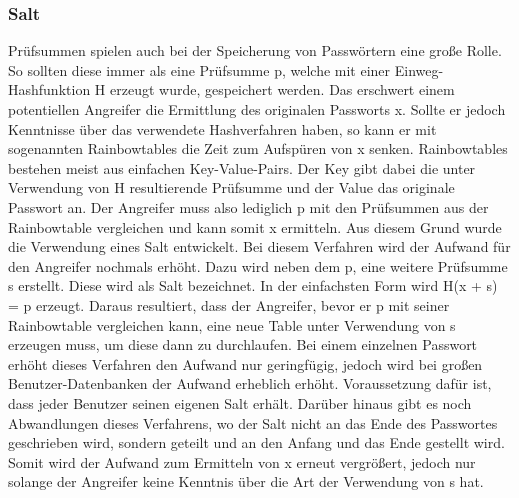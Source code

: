 \subsubsection{Salt}
\label{salt}
Prüfsummen spielen auch bei der Speicherung von Passwörtern eine große Rolle.
So sollten diese immer als eine Prüfsumme p, welche mit einer Einweg-Hashfunktion H erzeugt wurde, gespeichert werden.
Das erschwert einem potentiellen Angreifer die Ermittlung des originalen Passworts x.
Sollte er jedoch Kenntnisse über das verwendete Hashverfahren haben, so kann er mit sogenannten Rainbowtables die Zeit zum Aufspüren von x senken.
Rainbowtables bestehen meist aus einfachen Key-Value-Pairs.
Der Key gibt dabei die unter Verwendung von H resultierende Prüfsumme und der Value das originale Passwort an.
Der Angreifer muss also lediglich p mit den Prüfsummen aus der Rainbowtable vergleichen und kann somit x ermitteln.
Aus diesem Grund wurde die Verwendung eines Salt entwickelt.
Bei diesem Verfahren wird der Aufwand für den Angreifer nochmals erhöht.
Dazu wird neben dem p, eine weitere Prüfsumme s erstellt.
Diese wird als Salt bezeichnet.
In der einfachsten Form wird H(x + s) = p erzeugt.
Daraus resultiert, dass der Angreifer, bevor er p mit seiner Rainbowtable vergleichen kann, eine neue Table unter Verwendung von s erzeugen muss, um diese dann zu durchlaufen.
Bei einem einzelnen Passwort erhöht dieses Verfahren den Aufwand nur geringfügig, jedoch wird bei großen Benutzer-Datenbanken der Aufwand erheblich erhöht.
Voraussetzung dafür ist, dass jeder Benutzer seinen eigenen Salt erhält.
Darüber hinaus gibt es noch Abwandlungen dieses Verfahrens, wo der Salt nicht an das Ende des Passwortes geschrieben wird, sondern geteilt und an den Anfang und das Ende gestellt wird.
Somit wird der Aufwand zum Ermitteln von x erneut vergrößert, jedoch nur solange der Angreifer keine Kenntnis über die Art der Verwendung von s hat.